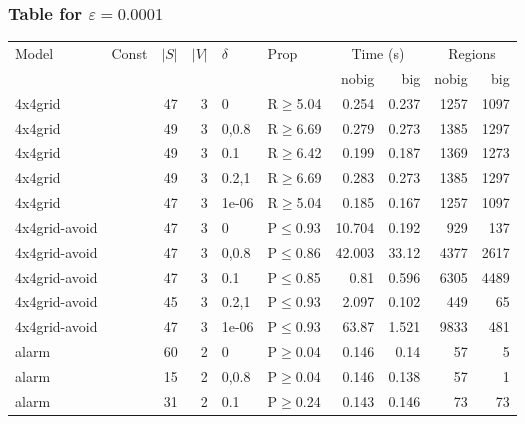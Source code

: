 \subsubsection{Table for \(\varepsilon=0.0001\)}
\begin{longtable}{llrrllrrrr}

        \toprule
        Model & Const & $|S|$ & $|V|$ & $\delta$ & Prop & \multicolumn{2}{c}{Time (s)} & \multicolumn{2}{c}{Regions} \\
        \cmidrule(ll){7-8} \cmidrule(ll){9-10}
        & & & & & & nobig & big & nobig & big \\
        \midrule
        
 4x4grid       &          &     	47 &   3 & 0     & R$\geq$5.04  & 0.254    & 0.237   & 1257    & 1097    \\
 4x4grid       &          &     	49 &   3 & 0,0.8 & R$\geq$6.69  & 0.279    & 0.273   & 1385    & 1297    \\
 4x4grid       &          &     	49 &   3 & 0.1   & R$\geq$6.42  & 0.199    & 0.187   & 1369    & 1273    \\
 4x4grid       &          &     	49 &   3 & 0.2,1 & R$\geq$6.69  & 0.283    & 0.273   & 1385    & 1297    \\
 4x4grid       &          &     	47 &   3 & 1e-06 & R$\geq$5.04  & 0.185    & 0.167   & 1257    & 1097    \\
 4x4grid-avoid &          &     	47 &   3 & 0     & P$\leq$0.93  & 10.704   & 0.192   & 929     & 137     \\
 4x4grid-avoid &          &     	47 &   3 & 0,0.8 & P$\leq$0.86  & 42.003   & 33.12   & 4377    & 2617    \\
 4x4grid-avoid &          &     	47 &   3 & 0.1   & P$\leq$0.85  & 0.81     & 0.596   & 6305    & 4489    \\
 4x4grid-avoid &          &     	45 &   3 & 0.2,1 & P$\leq$0.93  & 2.097    & 0.102   & 449     & 65      \\
 4x4grid-avoid &          &     	47 &   3 & 1e-06 & P$\leq$0.93  & 63.87    & 1.521   & 9833    & 481     \\
 alarm         &          &     	60 &   2 & 0     & P$\geq$0.04  & 0.146    & 0.14    & 57      & 5       \\
 alarm         &          &     	15 &   2 & 0,0.8 & P$\geq$0.04  & 0.146    & 0.138   & 57      & 1       \\
 alarm         &          &     	31 &   2 & 0.1   & P$\geq$0.24  & 0.143    & 0.146   & 73      & 73      \\

\end{longtable}
